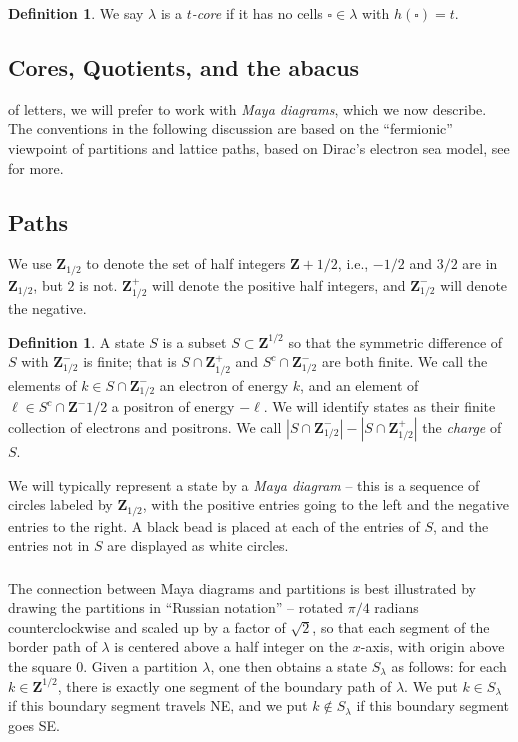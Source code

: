 \documentclass{amsart}[12pt]
\theoremstyle{definition}
\newtheorem{definition}[dummy]{Definition}
\newcommand{\Z}{\mathbf{Z}}
\begin{document}
\begin{definition} \label{def:tcore}
We say $\lambda$ is a \emph{$t$-core} if it has no cells $\square\in\lambda$ with $h(\square)=t$.
\end{definition}


\subsection{Cores, Quotients, and the abacus}

of letters, we will prefer to work with \emph{Maya diagrams}, which we now describe.  The conventions in the following discussion are based on the ``fermionic'' viewpoint of partitions and lattice paths, based on Dirac's electron sea model, see \cite{KR} for more. 


\subsection{Paths}

We use $\Z_{1/2}$ to denote the set of half integers $\Z+1/2$, i.e., $-1/2$ and $3/2$ are in $\Z_{1/2}$, but $2$ is not.  $\Z_{1/2}^+$ will denote the positive half integers, and $\Z_{1/2}^-$ will denote the negative.


\begin{definition}
  A state $S$ is a subset $S\subset \Z^{1/2}$ so that the symmetric difference of $S$ with $\Z^-_{1/2}$ is finite; that is $S\cap\Z^+_{1/2}$ and $S^c\cap \Z^-_{1/2}$ are both finite.  We call the elements of $k\in S\cap \Z^-_{1/2}$ an electron of energy $k$, and an element of $\ell\in S^c\cap \Z^-{1/2}$ a positron of energy $-\ell$.  We will identify states as their finite collection of electrons and positrons.  We call $|S\cap \Z^-_{1/2}|-|S\cap \Z^+_{1/2}|$ the \emph{charge} of $S$.
  
We will typically represent a state by a \emph{Maya diagram} -- this is a sequence of circles labeled by $\Z_{1/2}$, with the positive entries going to the left and the negative entries to the right.  A black bead is placed at each of the entries of $S$, and the entries not in $S$ are displayed as white circles.
\end{definition}



\subsubsection{}
The connection between Maya diagrams and partitions is best illustrated by drawing the partitions in ``Russian notation'' -- rotated $\pi/4$ radians counterclockwise and scaled up by a factor of $\sqrt{2}$, so that each segment of the border path of $\lambda$ is centered above a half integer on the $x$-axis, with origin above the square 0.  Given a partition $\lambda$, one then obtains a state $S_\lambda$ as follows: for each $k\in\Z^{1/2}$, there is exactly one segment of the boundary path of $\lambda$.  We put $k\in S_\lambda$ if this boundary segment travels NE, and we put $k\notin S_\lambda$ if this boundary segment goes SE.
\end{document}
